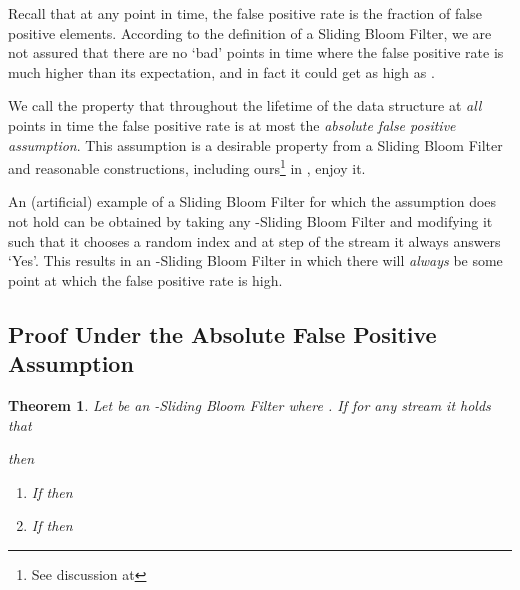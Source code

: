 \documentclass[11pt]{article}
\newtheorem{theorem}{Theorem}[section]
\begin{document}
Recall that at any point in time, the false positive rate is the fraction of false positive elements. According to the definition of a Sliding Bloom Filter, we are not assured that there are no `bad' points in time where the false positive rate is much higher than its expectation, and in fact it could get as high as .

We call the property that throughout the lifetime of the data structure at {\em all} points in time the false positive rate is at most  the \emph{absolute false positive assumption}. This assumption is a desirable property from a Sliding Bloom Filter and reasonable constructions, including ours\footnote{See discussion at } in , enjoy it.

An (artificial) example of a Sliding Bloom Filter for which the assumption does not hold can be obtained by taking any -Sliding Bloom Filter and modifying it such that it chooses a random index  and at step  of the stream it always answers `Yes'. This results in an -Sliding Bloom Filter in which there will \emph{always} be some point at which the false positive rate is high.

\subsection{Proof Under the Absolute False Positive Assumption}\label{sec:lower}


\begin{theorem}\label{LoweBoundAssumptionNumber}
Let  be an -Sliding Bloom Filter where . If for any stream  it holds that

then
\begin{enumerate}
\item If  then 
\item If  then 
\end{enumerate}
\end{theorem}
\end{document}
